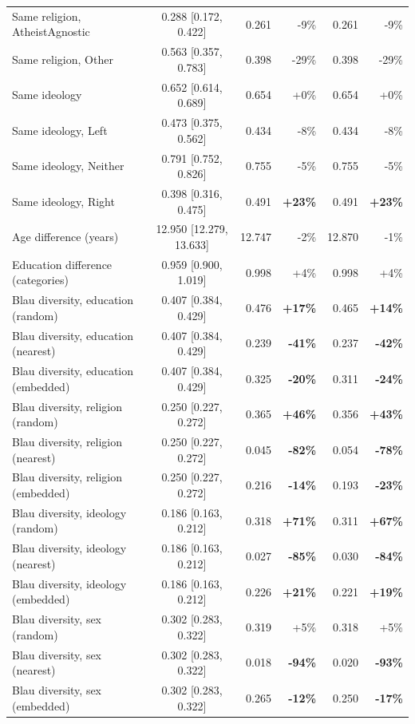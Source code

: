 \begin{tabular}{lcrrrr}
Same religion, AtheistAgnostic & 0.288 [0.172, 0.422] & 0.261 & -9\% & 0.261 & -9\% \\
Same religion, Other & 0.563 [0.357, 0.783] & 0.398 & -29\% & 0.398 & -29\% \\
Same ideology & 0.652 [0.614, 0.689] & 0.654 & +0\% & 0.654 & +0\% \\
Same ideology, Left & 0.473 [0.375, 0.562] & 0.434 & -8\% & 0.434 & -8\% \\
Same ideology, Neither & 0.791 [0.752, 0.826] & 0.755 & -5\% & 0.755 & -5\% \\
Same ideology, Right & 0.398 [0.316, 0.475] & 0.491 & \textbf{+23\%} & 0.491 & \textbf{+23\%} \\
Age difference (years) & 12.950 [12.279, 13.633] & 12.747 & -2\% & 12.870 & -1\% \\
Education difference (categories) & 0.959 [0.900, 1.019] & 0.998 & +4\% & 0.998 & +4\% \\
Blau diversity, education (random) & 0.407 [0.384, 0.429] & 0.476 & \textbf{+17\%} & 0.465 & \textbf{+14\%} \\
Blau diversity, education (nearest) & 0.407 [0.384, 0.429] & 0.239 & \textbf{-41\%} & 0.237 & \textbf{-42\%} \\
Blau diversity, education (embedded) & 0.407 [0.384, 0.429] & 0.325 & \textbf{-20\%} & 0.311 & \textbf{-24\%} \\
Blau diversity, religion (random) & 0.250 [0.227, 0.272] & 0.365 & \textbf{+46\%} & 0.356 & \textbf{+43\%} \\
Blau diversity, religion (nearest) & 0.250 [0.227, 0.272] & 0.045 & \textbf{-82\%} & 0.054 & \textbf{-78\%} \\
Blau diversity, religion (embedded) & 0.250 [0.227, 0.272] & 0.216 & \textbf{-14\%} & 0.193 & \textbf{-23\%} \\
Blau diversity, ideology (random) & 0.186 [0.163, 0.212] & 0.318 & \textbf{+71\%} & 0.311 & \textbf{+67\%} \\
Blau diversity, ideology (nearest) & 0.186 [0.163, 0.212] & 0.027 & \textbf{-85\%} & 0.030 & \textbf{-84\%} \\
Blau diversity, ideology (embedded) & 0.186 [0.163, 0.212] & 0.226 & \textbf{+21\%} & 0.221 & \textbf{+19\%} \\
Blau diversity, sex (random) & 0.302 [0.283, 0.322] & 0.319 & +5\% & 0.318 & +5\% \\
Blau diversity, sex (nearest) & 0.302 [0.283, 0.322] & 0.018 & \textbf{-94\%} & 0.020 & \textbf{-93\%} \\
Blau diversity, sex (embedded) & 0.302 [0.283, 0.322] & 0.265 & \textbf{-12\%} & 0.250 & \textbf{-17\%} \\
\hline
\end{tabular}
